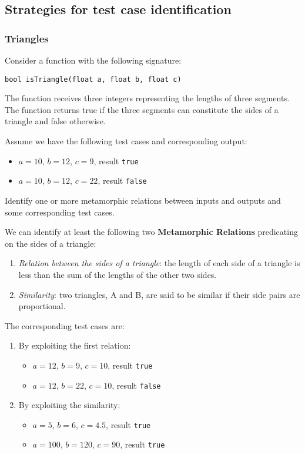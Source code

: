 \subsection{Strategies for test case identification}

\subsubsection{Triangles}

\descriptionproblem
Consider a function with the following signature:
\begin{center}
    \texttt{bool isTriangle(float a, float b, float c)}
\end{center}
The function receives three integers representing the lengths of three segments. The function returns true if the three segments can constitute the sides of a triangle and false otherwise.

\questionproblem
Assume we have the following test cases and corresponding output:
\begin{itemize}
    \item $a = 10$, $b = 12$, $c = 9$, result \texttt{true}
    \item $a = 10$, $b = 12$, $c = 22$, result \texttt{false}
\end{itemize}
Identify one or more metamorphic relations between inputs and outputs and some corresponding test cases.

\solution
We can identify at least the following two \textbf{Metamorphic Relations} predicating on the sides of a triangle:
\begin{enumerate}
    \item \emph{Relation between the sides of a triangle}: the length of each side of a triangle is less than the sum of the lengths of the other two sides.
    
    \item \emph{Similarity}: two triangles, A and B, are said to be similar if their side pairs are proportional.
\end{enumerate}
The corresponding test cases are:
\begin{enumerate}
    \item By exploiting the first relation:
    \begin{itemize}
        \item $a = 12$, $b = 9$, $c = 10$, result \texttt{true}
        \item $a = 12$, $b = 22$, $c = 10$, result \texttt{false}
    \end{itemize}

    \item By exploiting the similarity:
    \begin{itemize}
        \item $a = 5$, $b = 6$, $c = 4.5$, result \texttt{true}
        \item $a = 100$, $b = 120$, $c = 90$, result \texttt{true}
    \end{itemize}
\end{enumerate}